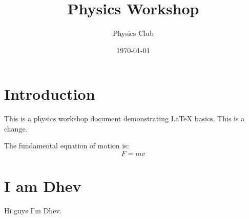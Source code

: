 \documentclass{article}
\title{Physics Workshop}
\author{Physics Club}
\date{\today}
\begin{document}
\maketitle

\section{Introduction}

This is a physics workshop document demonstrating LaTeX basics.
This is a change. 

The fundamental equation of motion is:
\begin{equation}
F = mv
\end{equation}

\section{I am Dhev}

Hi guys I'm Dhev.


\printbibliography
\end{document}
